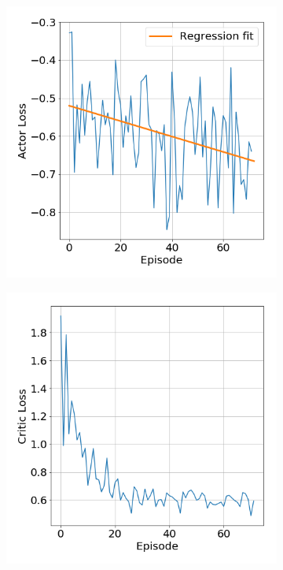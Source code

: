 \documentclass{article}
\begin{document}
    \begin{figure}[t!]
        \vskip 5mm
        \begin{center}
        \begin{subfigure}[b]{0.4\textwidth}
        \centerline{\includegraphics[width=\columnwidth]{figures/actor_loss.png}}
        \end{subfigure}
        \begin{subfigure}[b]{0.4\textwidth}
        \centerline{\includegraphics[width=\columnwidth]{figures/critic_loss.png}}
        \end{subfigure}
        

\end{center}
\end{figure}
\end{document}
